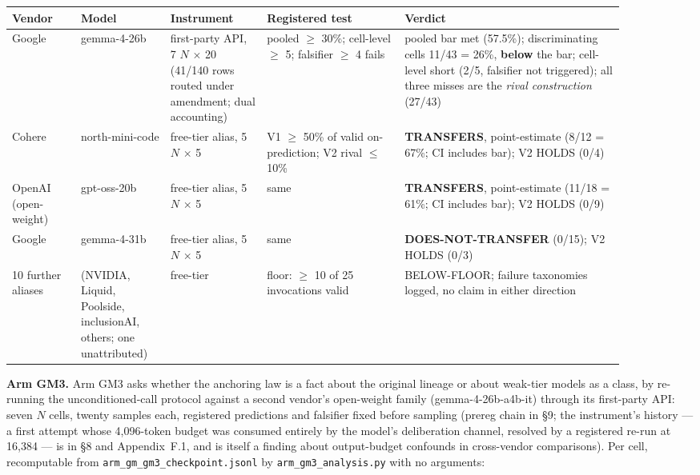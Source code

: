 \begin{center}
\begin{small}
\setlength{\tabcolsep}{3.5pt}
\begin{tabular}{@{}p{0.10\linewidth}p{0.13\linewidth}p{0.14\linewidth}p{0.20\linewidth}p{0.32\linewidth}@{}}
\toprule
Vendor & Model & Instrument & Registered test & Verdict \\
\midrule
Google & gemma-4-26b & first-party API, 7 $N$ $\times$ 20 (41/140 rows routed under amendment; dual accounting) & pooled $\ge$ 30\%; cell-level $\ge$ 5; falsifier $\ge$ 4 fails & pooled bar met (57.5\%); discriminating cells 11/43 = 26\%, \textbf{below} the bar; cell-level short (2/5, falsifier not triggered); all three misses are the \emph{rival construction} (27/43) \\
Cohere & north-mini-code & free-tier alias, 5 $N$ $\times$ 5 & V1 $\ge$ 50\% of valid on-prediction; V2 rival $\le$ 10\% & \textbf{TRANSFERS}, point-estimate (8/12 = 67\%; CI includes bar); V2 HOLDS (0/4) \\
OpenAI (open-weight) & gpt-oss-20b & free-tier alias, 5 $N$ $\times$ 5 & same & \textbf{TRANSFERS}, point-estimate (11/18 = 61\%; CI includes bar); V2 HOLDS (0/9) \\
Google & gemma-4-31b & free-tier alias, 5 $N$ $\times$ 5 & same & \textbf{DOES-NOT-TRANSFER} (0/15); V2 HOLDS (0/3) \\
10 further aliases & (NVIDIA, Liquid, Poolside, inclusionAI, others; one unattributed) & free-tier & floor: $\ge$ 10 of 25 invocations valid & BELOW-FLOOR; failure taxonomies logged, no claim in either direction \\
\bottomrule
\end{tabular}
\end{small}
\end{center}

\textbf{Arm GM3.} Arm GM3 asks whether the anchoring law is a
fact about the original lineage or about weak-tier models as a class, by re-running the
unconditioned-call protocol against a second vendor's open-weight family
(gemma-4-26b-a4b-it) through its first-party API: seven $N$ cells, twenty samples each,
registered predictions and falsifier fixed before sampling (prereg chain in \S9; the
instrument's history --- a first attempt whose 4,096-token budget was consumed entirely by the
model's deliberation channel, resolved by a registered re-run at 16,384 --- is in \S8 and
Appendix~F.1, and is itself a finding about output-budget confounds in cross-vendor comparisons).
Per cell, recomputable from \texttt{arm\_gm\_gm3\_checkpoint.jsonl} by \texttt{arm\_gm3\_analysis.py}
with no arguments:

